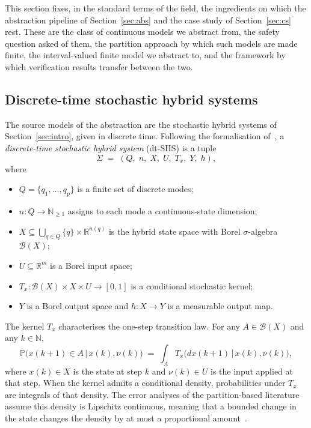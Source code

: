 \documentclass[11pt,a4paper]{article}
\newcommand{\R}{\mathbb{R}}
\newcommand{\Prob}{\mathbb{P}}
\theoremstyle{plain}
\theoremstyle{remark}
\begin{document}
	This section fixes, in the standard terms of the field, the ingredients on which the abstraction pipeline of Section~\ref{sec:abs} and the case study of Section~\ref{sec:cs} rest. These are the class of continuous models we abstract from, the safety question asked of them, the partition approach by which such models are made finite, the interval-valued finite model we abstract to, and the framework by which verification results transfer between the two.
	
	\subsection{Discrete-time stochastic hybrid systems}
	\label{sec:bg:dtshs}
	
	The source models of the abstraction are the stochastic hybrid systems of Section~\ref{sec:intro}, given in discrete time. Following the formalisation of~\cite[Def.~1.2]{LSAZ22}, a \emph{discrete-time stochastic hybrid system} (dt-SHS) is a tuple
	\begin{equation}
		\Sigma \;=\; (Q,\; n,\; X,\; U,\; T_x,\; Y,\; h),
		\label{eq:dtshs}
	\end{equation}
	where
	\begin{itemize}
		\item $Q = \{q_1, \ldots, q_p\}$ is a finite set of discrete modes;
		\item $n : Q \to \mathbb{N}_{\ge 1}$ assigns to each mode a continuous-state dimension;
		\item $X \subseteq \bigcup_{q \in Q} \{q\} \times \R^{n(q)}$ is the hybrid state space with Borel $\sigma$-algebra $\mathcal{B}(X)$;
		\item $U \subseteq \R^m$ is a Borel input space;
		\item $T_x : \mathcal{B}(X) \times X \times U \to [0,1]$ is a conditional stochastic kernel;
		\item $Y$ is a Borel output space and $h : X \to Y$ is a measurable output map.
	\end{itemize}
	The kernel $T_x$ characterises the one-step transition law. For any $A \in \mathcal{B}(X)$ and any $k \in \mathbb{N}$,
	\begin{equation}
		\Prob\bigl(x(k+1) \in A \,\big|\, x(k), \nu(k)\bigr) \;=\; \int_A T_x\bigl(dx(k+1) \,\big|\, x(k), \nu(k)\bigr),
		\label{eq:dtshs-kernel}
	\end{equation}
	where $x(k) \in X$ is the state at step $k$ and $\nu(k) \in U$ is the input applied at that step. When the kernel admits a conditional density, probabilities under $T_x$ are integrals of that density. The error analyses of the partition-based literature assume this density is Lipschitz continuous, meaning that a bounded change in the state changes the density by at most a proportional amount~\cite[Def.~3.1]{LSAZ22}.
	
\end{document}

